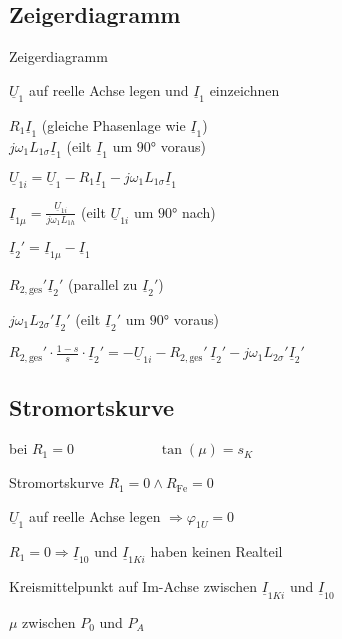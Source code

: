 \begin{sectionbox}
\subsection{Zeigerdiagramm}
\begin{cookbox}{Zeigerdiagramm}
\item $\underline{U}_1$ auf reelle Achse legen und $\underline{I}_1$ einzeichnen
\item $R_1\underline{I}_1$ (gleiche Phasenlage wie $\underline{I}_1$)\\
$j\omega_1 L_{1\sigma}\underline{I}_1$ (eilt $\underline{I}_1$ um $\ang{90}$ voraus)
\item $\underline{U}_{1i} = \underline{U}_1 - R_1\underline{I}_1 - j\omega_1 L_{1\sigma}\underline{I}_1$
\item $\underline{I}_{1\mu} = \frac{\underline{U}_{1i}}{j\omega_1 L_{1h}}$ (eilt $\underline{U}_{1i}$ um $\ang{90}$ nach)
\item $\underline{I}_2' = \underline{I}_{1\mu} - \underline{I}_1$
\item $R_{2,\text{ges}}'\underline{I}_2'$ (parallel zu $\underline{I}_2'$)
\item $j\omega_1 L_{2\sigma}'\underline{I}_2'$ (eilt $\underline{I}_2'$ um $\ang{90}$ voraus)
\item $R_{2,\text{ges}}'\cdot\frac{1-s}{s}\cdot\underline{I}_2' = -\underline{U}_{1i} - R_{2,\text{ges}}'\,\underline{I}_2' - j\omega_1 L_{2\sigma}'\underline{I}_2'$
\end{cookbox}
\begin{center}

\end{center}
\end{sectionbox}

\begin{sectionbox}
\subsection{Stromortskurve}
\begin{symbolbox}
  bei $R_1 = 0\qquad\qquad\qquad\tan(\mu) = s_K$
\end{symbolbox}
\begin{cookbox}{Stromortskurve $R_1 = 0\wedge R_\text{Fe} = 0$}
\item $\underline{U}_1$ auf reelle Achse legen $\Rightarrow\varphi_{1U} = 0$
\item $R_1 = 0\Rightarrow \underline I_{10}$ und $\underline I_{1Ki}$ haben keinen Realteil
\item Kreismittelpunkt auf Im-Achse zwischen $\underline{I}_{1Ki}$ und $\underline{I}_{10}$
\item $\mu$ zwischen $P_0$ und $P_A$
\end{cookbox}

\end{sectionbox}

